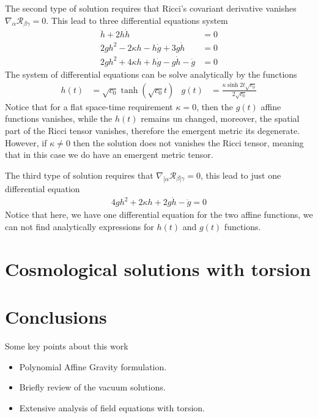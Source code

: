 \documentclass[10pt,a4paper]{article}
\begin{document}
The second type of solution requires that Ricci's covariant derivative vanishes $\nabla_{\alpha}\mathcal{R}_{\beta\gamma}  = 0$. This lead to
three differential equations system
\begin{align}
  \ddot{h} + 2h\dot{h} & = 0 \\
  2gh^2 - 2\kappa h - h\dot{g} + 3g\dot{h} & = 0 \\
  2gh^2 + 4\kappa h + h\dot{g} - g\dot{h} - \ddot{g} & = 0
\end{align}
The system of differential equations can be solve analytically by the functions
\begin{align}
  h(t) & = \sqrt{c_0}\tanh\left(\sqrt{c_0}t\right) & g(t) & = \frac{\kappa \sinh{2t\sqrt{c_0}}}{2\sqrt{c_0}} 
\end{align}
Notice that for a flat space-time requirement $\kappa = 0$, then the $g(t)$ affine functions vanishes, while the $h(t)$ remains un changed, moreover,
the spatial part of the Ricci tensor vanishes, therefore the emergent metric its degenerate. However, if $\kappa \neq 0$ then the solution does 
not vanishes the Ricci tensor, meaning that in this case we do have an emergent metric tensor.


The third type of solution requires that $\nabla_{[\alpha}\mathcal{R}_{\beta]\gamma}  = 0$, this lead to just one differential equation
\begin{align}
  4gh^2 + 2\kappa h + 2g\dot{h} - \ddot{g} = 0
\end{align}
Notice that here, we have one differential equation for the two affine functions, we can not find analytically expressions for $h(t)$ and $g(t)$ functions.



\section{Cosmological solutions with torsion}


\section{Conclusions}

Some key points about this work

\begin{itemize}
  \item Polynomial Affine Gravity formulation.
  \item Briefly review of the vacuum solutions.
  \item Extensive analysis of field equations with torsion.
\end{itemize}
\end{document}
